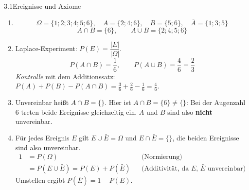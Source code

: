 

\begin{loesung}{3.1}{Ereignisse und Axiome}
\begin{enumerate}[label=\alph*)]
  \item \[\Omega = \{1;2;3;4;5;6\},\quad A = \{2;4;6\},\quad B = \{5;6\},\quad \bar{A} = \{1;3;5\}\]
  \[A\cap B = \{6\},\qquad A\cup B = \{2;4;5;6\}\]
  \item Laplace-Experiment: $P(E) = \dfrac{|E|}{|\Omega|}$.
  \[P(A\cap B) = \dfrac{1}{6},\qquad P(A\cup B) = \dfrac{4}{6} = \dfrac{2}{3}\]
  \textit{Kontrolle} mit dem Additionssatz: $P(A)+P(B)-P(A\cap B) = \frac{3}{6}+\frac{2}{6}-\frac{1}{6} = \frac{4}{6}$.
  \item Unvereinbar heißt $A\cap B = \{\}$. Hier ist $A\cap B = \{6\}\neq\{\}$: Bei der Augenzahl $6$ treten beide Ereignisse gleichzeitig ein. $A$ und $B$ sind also \textbf{nicht} unvereinbar.
  \item Für jedes Ereignis $E$ gilt $E\cup\bar{E} = \Omega$ und $E\cap\bar{E} = \{\}$, die beiden Ereignisse sind also unvereinbar.
  \begin{align*}
    1 &= P(\Omega) && \text{(Normierung)}\\
      &= P(E\cup\bar{E}) = P(E)+P(\bar{E}) && \text{(Additivität, da $E$, $\bar{E}$ unvereinbar)}
  \end{align*}
  Umstellen ergibt $P(\bar{E}) = 1-P(E)$.
\end{enumerate}
\end{loesung}

